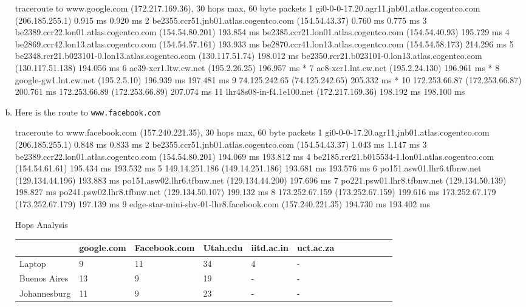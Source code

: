 \documentclass{article}
\begin{document}
\begin{enumerate}[a.]
\begin{code}
traceroute to www.google.com (172.217.169.36), 30 hops max, 60 byte packets
 1  gi0-0-0-17.20.agr11.jnb01.atlas.cogentco.com (206.185.255.1)  0.915 ms  0.920 ms
 2  be2355.ccr51.jnb01.atlas.cogentco.com (154.54.43.37)  0.760 ms  0.775 ms
 3  be2389.ccr22.lon01.atlas.cogentco.com (154.54.80.201)  193.854 ms be2385.ccr21.lon01.atlas.cogentco.com (154.54.40.93)  195.729 ms
 4  be2869.ccr42.lon13.atlas.cogentco.com (154.54.57.161)  193.933 ms be2870.ccr41.lon13.atlas.cogentco.com (154.54.58.173)  214.296 ms
 5  be2348.rcr21.b023101-0.lon13.atlas.cogentco.com (130.117.51.74)  198.012 ms be2350.rcr21.b023101-0.lon13.atlas.cogentco.com (130.117.51.138)  194.056 ms
 6  ae39-xcr1.ltw.cw.net (195.2.26.25)  196.957 ms *
 7  ae8-xcr1.lnt.cw.net (195.2.24.130)  196.961 ms *
 8  google-gw1.lnt.cw.net (195.2.5.10)  196.939 ms  197.481 ms
 9  74.125.242.65 (74.125.242.65)  205.332 ms *
10  172.253.66.87 (172.253.66.87)  200.761 ms 172.253.66.89 (172.253.66.89)  207.074 ms
11  lhr48s08-in-f4.1e100.net (172.217.169.36)  198.192 ms  198.100 ms
\end{code}
\item Here is the route to {\tt www.facebook.com}
\begin{code}
traceroute to www.facebook.com (157.240.221.35), 30 hops max, 60 byte packets
 1  gi0-0-0-17.20.agr11.jnb01.atlas.cogentco.com (206.185.255.1)  0.848 ms  0.833 ms
 2  be2355.ccr51.jnb01.atlas.cogentco.com (154.54.43.37)  1.043 ms  1.147 ms
 3  be2389.ccr22.lon01.atlas.cogentco.com (154.54.80.201)  194.069 ms  193.812 ms
 4  be2185.rcr21.b015534-1.lon01.atlas.cogentco.com (154.54.61.61)  195.434 ms  193.532 ms
 5  149.14.251.186 (149.14.251.186)  193.681 ms  193.576 ms
 6  po151.asw01.lhr6.tfbnw.net (129.134.44.196)  193.883 ms po151.asw02.lhr6.tfbnw.net (129.134.44.200)  197.696 ms
 7  po221.psw01.lhr8.tfbnw.net (129.134.50.139)  198.827 ms po241.psw02.lhr8.tfbnw.net (129.134.50.107)  199.132 ms
 8  173.252.67.159 (173.252.67.159)  199.616 ms 173.252.67.179 (173.252.67.179)  197.139 ms
 9  edge-star-mini-shv-01-lhr8.facebook.com (157.240.221.35)  194.730 ms  193.402 ms
\end{code}

Hops Analysis

\begin{table}[!ht]
    \centering
    \begin{tabular}{|l|l|l|l|l|l|l|l|l|l|}
    \hline
        ~ & google.com & Facebook.com & Utah.edu & iitd.ac.in & uct.ac.za & ~ & ~ & ~ & ~ \\ \hline
        Laptop & 9 & 11 & 34 & 4 & - & ~ & ~ & ~ & ~ \\ \hline
        Buenos Aires & 13 & 9 & 19 & - & - & ~ & ~ & ~ & ~ \\ \hline
        Johannesburg & 11 & 9 & 23 & - & - & ~ & ~ & ~ & ~ \\ \hline
    \end{tabular}
\end{table}


\end{enumerate}
\end{document}
